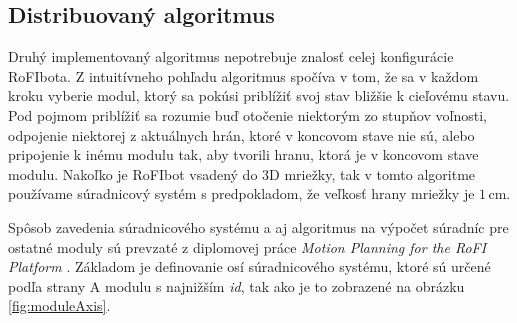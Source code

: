 \documentclass[
  digital, %
  oneside, %
  notable,   %
  lof,     %
  nolot,     %
]{fithesis3}
\begin{document}
\subsection{Distribuovaný algoritmus}
\label{sec:distributedAlgo}
Druhý implementovaný algoritmus nepotrebuje znalosť celej konfigurácie RoFIbota. Z intuitívneho pohľadu algoritmus spočíva v tom, že sa v každom kroku vyberie modul, ktorý sa pokúsi priblížiť svoj stav bližšie k cieľovému stavu. Pod pojmom priblížiť sa rozumie buď otočenie niektorým zo stupňov voľnosti, odpojenie niektorej z aktuálnych hrán, ktoré v koncovom stave nie sú, alebo pripojenie k inému modulu tak, aby tvorili hranu, ktorá je v koncovom stave modulu. Nakoľko je RoFIbot vsadený do 3D mriežky, tak v tomto algoritme používame súradnicový systém s predpokladom, že veľkosť hrany mriežky je $1$\,cm. 

Spôsob zavedenia súradnicového systému a aj algoritmus na výpočet súradníc pre ostatné moduly sú prevzaté z diplomovej práce \textit{Motion Planning for the RoFI Platform} \cite{vozarovaMasterThesis}. Základom je definovanie osí súradnicového systému, ktoré sú určené podľa strany A modulu s najnižším \textit{id}, tak ako je to zobrazené na obrázku \ref{fig:moduleAxis}. 
\end{document}
